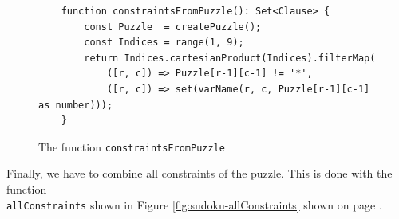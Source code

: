 \begin{figure}[!ht]
\centering
\begin{verbatim}
    function constraintsFromPuzzle(): Set<Clause> {
        const Puzzle  = createPuzzle();
        const Indices = range(1, 9);    
        return Indices.cartesianProduct(Indices).filterMap(
            ([r, c]) => Puzzle[r-1][c-1] != '*',
            ([r, c]) => set(varName(r, c, Puzzle[r-1][c-1] as number)));
    }
\end{verbatim}
\vspace*{-0.3cm}
\caption{The function \texttt{constraintsFromPuzzle}}
\label{fig:sudoku-constraintsFromPuzzle}
\end{figure}

Finally, we have to combine all constraints of the puzzle.  This is done with the function \\
\texttt{allConstraints} shown in Figure \ref{fig:sudoku-allConstraints} shown on page \pageref{fig:sudoku-allConstraints}.

